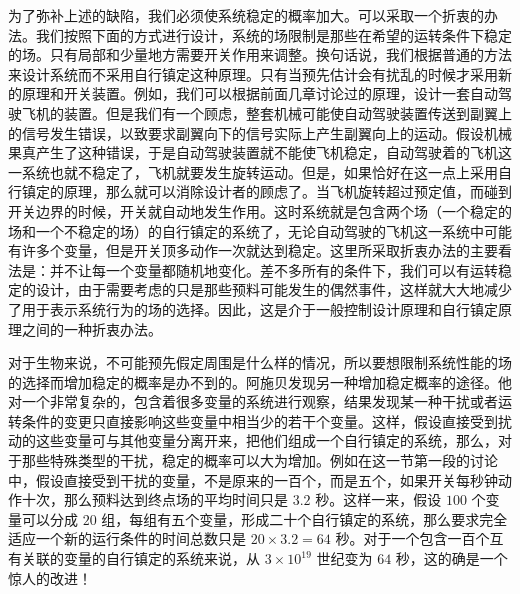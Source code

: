 为了弥补上述的缺陷，我们必须使系统稳定的概率加大。可以采取一个折衷的办法。我们按照下面的方式进行设计，系统的场限制是那些在希望的运转条件下稳定的场。只有局部和少量地方需要开关作用来调整。换句话说，我们根据普通的方法来设计系统而不采用自行镇定这种原理。只有当预先估计会有扰乱的时候才采用新的原理和开关装置。例如，我们可以根据前面几章讨论过的原理，设计一套自动驾驶飞机的装置。但是我们有一个顾虑，整套机械可能使自动驾驶装置传送到副翼上的信号发生错误，以致要求副翼向下的信号实际上产生副翼向上的运动。假设机械果真产生了这种错误，于是自动驾驶装置就不能使飞机稳定，自动驾驶着的飞机这一系统也就不稳定了，飞机就要发生旋转运动。但是，如果恰好在这一点上采用自行镇定的原理，那么就可以消除设计者的顾虑了。当飞机旋转超过预定值，而碰到开关边界的时候，开关就自动地发生作用。这时系统就是包含两个场（一个稳定的场和一个不稳定的场）的自行镇定的系统了，无论自动驾驶的飞机这一系统中可能有许多个变量，但是开关顶多动作一次就达到稳定。这里所采取折衷办法的主要看法是：并不让每一个变量都随机地变化。差不多所有的条件下，我们可以有运转稳定的设计，由于需要考虑的只是那些预料可能发生的偶然事件，这样就大大地减少了用于表示系统行为的场的选择。因此，这是介于一般控制设计原理和自行镇定原理之间的一种折衷办法。

对于生物来说，不可能预先假定周围是什么样的情况，所以要想限制系统性能的场的选择而增加稳定的概率是办不到的。阿施贝发现另一种增加稳定概率的途径。他对一个非常复杂的，包含着很多变量的系统进行观察，结果发现某一种干扰或者运转条件的变更只直接影响这些变量中相当少的若干个变量。这样，假设直接受到扰动的这些变量可与其他变量分离开来，把他们组成一个自行镇定的系统，那么，对于那些特殊类型的干扰，稳定的概率可以大为增加。例如在这一节第一段的讨论中，假设直接受到干扰的变量，不是原来的一百个，而是五个，如果开关每秒钟动作十次，那么预料达到终点场的平均时间只是 $3.2$ 秒。这样一来，假设 $100$ 个变量可以分成 $20$ 组，每组有五个变量，形成二十个自行镇定的系统，那么要求完全适应一个新的运行条件的时间总数只是 $20\times3.2=64$ 秒。对于一个包含一百个互有关联的变量的自行镇定的系统来说，从 $3\times10^{19}$ 世纪变为 $64$ 秒，这的确是一个惊人的改进！


